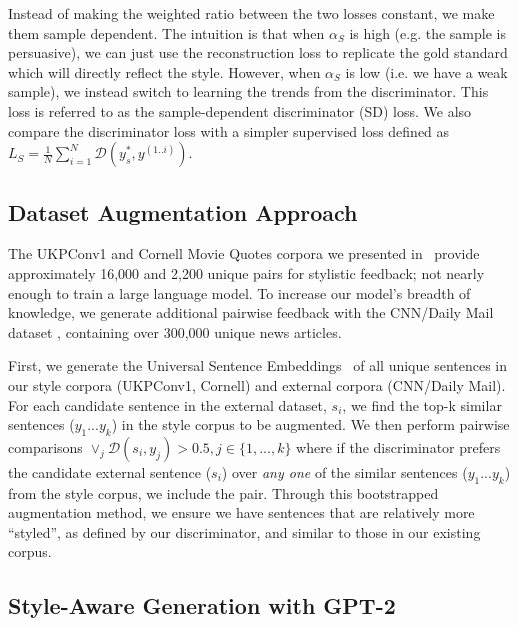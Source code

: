 Instead of making the weighted ratio between the two losses constant, we make them sample dependent. The intuition is that when $\alpha_{S}$ is high (e.g. the sample is persuasive), we can just use the reconstruction loss to replicate the gold standard which will directly reflect the style. However, when $\alpha_{S}$ is low (i.e. we have a weak sample), we instead switch to learning the trends from the discriminator. This loss is referred to as the sample-dependent discriminator (SD) loss. We also compare the discriminator loss with a simpler supervised loss defined as $L_{S} = \frac{1}{N} \sum_{i=1}^{N} \mathcal{D}(y_s^*, y^{(1..i)})$.


\subsection{Dataset Augmentation Approach}
\label{subsec:si_dataset}

The UKPConv1 and Cornell Movie Quotes corpora we presented in~ provide approximately 16,000 and 2,200 unique pairs for stylistic feedback; not nearly enough to train a large language model. To increase our model's breadth of knowledge, we generate additional pairwise feedback with the CNN/Daily Mail dataset \citep{see-etal-2017-get}, containing over 300,000 unique news articles. 

First, we generate the Universal Sentence Embeddings~\citep{cer-2018} of all unique sentences in our style corpora (UKPConv1, Cornell) and external corpora (CNN/Daily Mail). For each candidate sentence in the external dataset, $s_i$, we find the top-k similar sentences ($y_1 ... y_k$) in the style corpus to be augmented. We then perform pairwise comparisons $\lor_{j} \mathcal{D}(s_i, y_j) > 0.5, j \in \{1, ..., k\}$ where if the discriminator prefers the candidate external sentence ($s_i$) over \textit{any one} of the similar sentences ($y_1 ... y_k$) from the style corpus, we include the pair. Through this bootstrapped augmentation method, we ensure we have sentences that are relatively more ``styled'', as defined by our discriminator, and similar to those in our existing corpus. 

\subsection{Style-Aware Generation with GPT-2}
\label{subsec:si_gpt}

